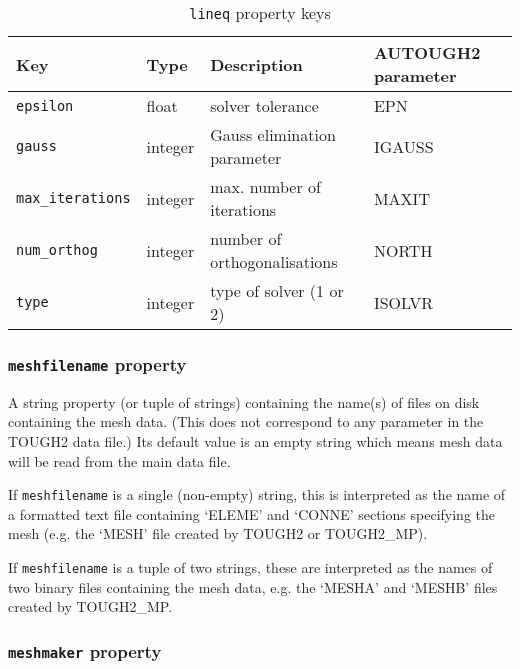 \begin{table}
  \begin{center}
    \begin{tabular}{|l|l|l|l|}
      \hline
      \textbf{Key} & \textbf{Type} & \textbf{Description} & \textbf{AUTOUGH2 parameter}\\
      \hline
      \texttt{epsilon} & float & solver tolerance & EPN\\
      \texttt{gauss} & integer & Gauss elimination parameter & IGAUSS\\
      \texttt{max\_iterations} & integer & max. number of iterations & MAXIT\\
      \texttt{num\_orthog} & integer & number of orthogonalisations & NORTH\\
      \texttt{type} & integer & type of solver (1 or 2) & ISOLVR\\
      \hline
    \end{tabular}
    \caption{\texttt{lineq} property keys}
    \label{tb:lineq}
  \end{center}
\end{table}

\begin{snugshade}
\subsubsection{\texttt{meshfilename} property}
\end{snugshade}
\label{sec:t2data:meshfilename}

A string property (or tuple of strings) containing the name(s) of files on disk containing the mesh data.  (This does not correspond to any parameter in the TOUGH2 data file.)  Its default value is an empty string which means mesh data will be read from the main data file.

If \texttt{meshfilename} is a single (non-empty) string, this is interpreted as the name of a formatted text file containing `ELEME' and `CONNE' sections specifying the mesh (e.g. the `MESH' file created by TOUGH2 or TOUGH2\_MP).

If \texttt{meshfilename} is a tuple of two strings, these are interpreted as the names of two binary files containing the mesh data, e.g. the `MESHA' and `MESHB' files created by TOUGH2\_MP.

\begin{snugshade}
\subsubsection{\texttt{meshmaker} property}
\end{snugshade}
\label{sec:t2data:meshmaker}

